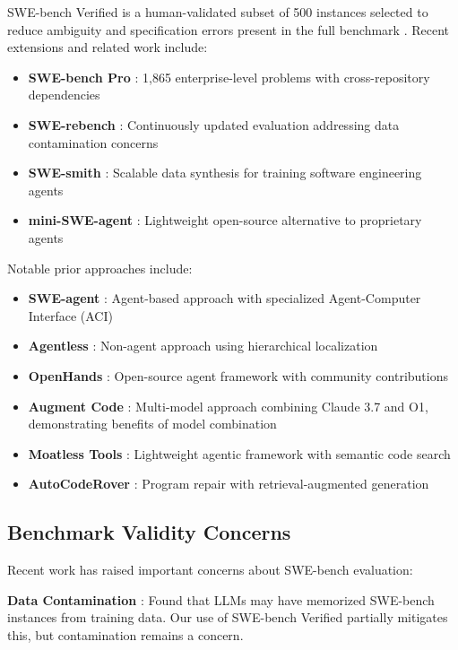 \documentclass[11pt,a4paper]{article}
\begin{document}
SWE-bench Verified is a human-validated subset of 500 instances selected to reduce ambiguity and specification errors present in the full benchmark \citep{jimenez2024swebench}. Recent extensions and related work include:

\begin{itemize}
    \item \textbf{SWE-bench Pro} \citep{deng2025swebenchpro}: 1,865 enterprise-level problems with cross-repository dependencies
    \item \textbf{SWE-rebench} \citep{nebius2025swebrebench}: Continuously updated evaluation addressing data contamination concerns
    \item \textbf{SWE-smith} \citep{yang2025swesmith}: Scalable data synthesis for training software engineering agents
    \item \textbf{mini-SWE-agent} \citep{liu2025minisweagent}: Lightweight open-source alternative to proprietary agents
\end{itemize}

Notable prior approaches include:
\begin{itemize}
    \item \textbf{SWE-agent} \citep{yang2024sweagent}: Agent-based approach with specialized Agent-Computer Interface (ACI)
    \item \textbf{Agentless} \citep{zhang2024agentless}: Non-agent approach using hierarchical localization
    \item \textbf{OpenHands} \citep{wang2024openhands}: Open-source agent framework with community contributions
    \item \textbf{Augment Code} \citep{augment2025}: Multi-model approach combining Claude 3.7 and O1, demonstrating benefits of model combination
    \item \textbf{Moatless Tools} \citep{moatless2024}: Lightweight agentic framework with semantic code search
    \item \textbf{AutoCodeRover} \citep{autocoderover2024}: Program repair with retrieval-augmented generation
\end{itemize}

\subsection{Benchmark Validity Concerns}

Recent work has raised important concerns about SWE-bench evaluation:

\textbf{Data Contamination} \citep{prathifkumar2025contamination}: Found that LLMs may have memorized SWE-bench instances from training data. Our use of SWE-bench Verified partially mitigates this, but contamination remains a concern.
\end{document}
